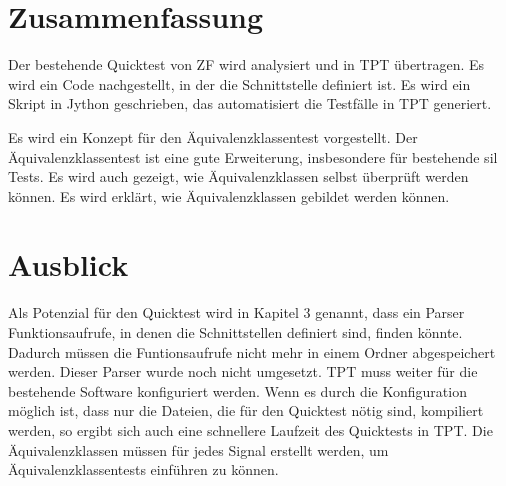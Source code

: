 \section*{Zusammenfassung}
Der bestehende Quicktest von ZF wird analysiert und in TPT übertragen. Es wird ein Code nachgestellt, in der die
Schnittstelle definiert ist.
Es wird ein Skript in Jython
geschrieben, das automatisiert die Testfälle in TPT generiert.

Es wird ein Konzept für den Äquivalenzklassentest vorgestellt. Der Äquivalenzklassentest ist eine gute Erweiterung,
insbesondere für bestehende \ac{sil} Tests. Es wird auch gezeigt, wie Äquivalenzklassen selbst überprüft werden können.
Es wird erklärt, wie Äquivalenzklassen gebildet werden können.


\section*{Ausblick}
Als Potenzial für den Quicktest wird in Kapitel 3 genannt, dass ein Parser Funktionsaufrufe, in denen die Schnittstellen
definiert sind, finden könnte. Dadurch müssen die Funtionsaufrufe nicht mehr in einem Ordner abgespeichert 
werden. Dieser Parser wurde noch nicht umgesetzt. 
TPT muss weiter für die bestehende Software konfiguriert werden. Wenn es durch die Konfiguration möglich ist, 
dass nur die Dateien, die für den Quicktest nötig sind, kompiliert werden, so ergibt sich auch eine schnellere 
Laufzeit des Quicktests in TPT. Die Äquivalenzklassen müssen für jedes Signal erstellt werden, um Äquivalenzklassentests
einführen zu können.

